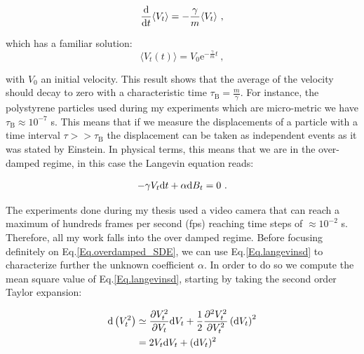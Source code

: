 \begin{equation}
	 \frac{ \textnormal{d}}{\textnormal{d}t}\langle V_t \rangle = - \frac{\gamma}{m} \langle V_t \rangle ~,
\end{equation}

which has a familiar solution:
\begin{equation}
	\langle V_t (t) \rangle =   V_0 \mathrm{e}^{-\frac{\gamma}{m} t}~,
	\label{Eq.int_V_langevin}
\end{equation}

with $V_0$ an initial velocity. This result shows that the average of the velocity should decay to zero with a characteristic time $\tau _\mathrm{B} = \frac{m}{\gamma}$. For instance, the polystyrene particles used during my experiments which are micro-metric we have $\tau_\mathrm{B} \approx 10^{-7}$ s. This means that if we measure the displacements of a particle with a time interval $ \tau  >> \tau _\mathrm{B} $ the displacement can be taken as independent events as it was stated by Einstein. In physical terms, this means that we are in the over-damped regime, in this case the Langevin equation reads:

\begin{equation}
	-\gamma V_t \textnormal{d}t  + \alpha  \textnormal{d}B_t = 0~.
	\label{Eq.overdamped_SDE}
\end{equation}

The experiments done during my thesis used a video camera that can reach a maximum of hundreds frames per second (\gls{fps}) reaching time steps of $\approx 10^{-2}$ s. Therefore, all my work falls into the over damped regime. Before focusing definitely on Eq.\ref{Eq.overdamped_SDE}, we can use Eq.\ref{Eq.langevinsd} to characterize further the unknown coefficient $\alpha$. In order to do so we compute the mean square value of Eq.\ref{Eq.langevinsd}, starting by taking the second order Taylor expansion:


\begin{equation}
	\begin{aligned}
	\textnormal{d}\left(V_t^2\right) &\simeq \frac{\partial V_t ^ 2}{\partial V_t} \textnormal{d} V_t + \frac{1}{2} \frac{\partial ^2 V_t^2}{\partial V_t ^2} \left( \textnormal{d}V_t \right)^2  \\
	& = 2 V_t \textnormal{d}V_t + (\textnormal{d}V_t)^2 \\	
	\end{aligned}
	\label{Eq.compute1}
\end{equation}

